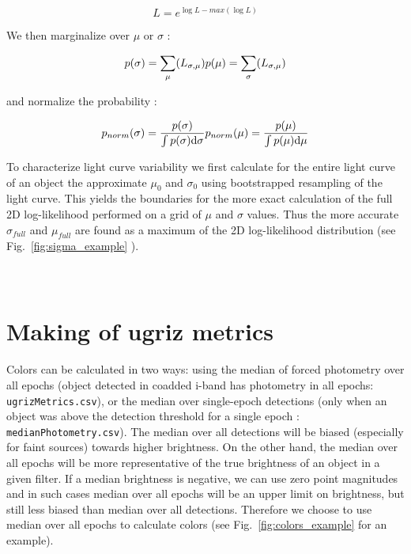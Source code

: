 \documentclass[fleqn,usenatbib]{mnras}  %
\begin{document}
\begin{equation}
L = e^{\log{L} - max(\log{L})}
\end{equation}

We then marginalize over $\mu$ or $\sigma$ : 

\begin{equation}
p(\sigma) = \sum_{\mu}(L_{\sigma,\mu}) \\
p(\mu) = \sum_{\sigma}(L_{\sigma,\mu})
\end{equation}

and normalize the probability :

\begin{equation}
p_{norm}(\sigma) = \frac{p(\sigma)}{ \int {p(\sigma) \text{d}\sigma}} \\ 
p_{norm}(\mu) = \frac{p(\mu)} {\int {p(\mu) \text{d}\mu} }
\end{equation}


To characterize  light curve variability we first calculate for the entire light curve of an object  the approximate $\mu_{0}$ and $\sigma_{0}$ using bootstrapped resampling of the light curve.  This yields the boundaries for the more exact calculation of the full 2D log-likelihood performed on a grid of $\mu$ and $\sigma$ values. Thus the more accurate $\sigma_{full}$ and $\mu_{full}$ are found as a maximum of the 2D log-likelihood distribution (see Fig.~\ref{fig:sigma_example} ).



\section{\\ Making of ugriz metrics }
\label{esc:ugriz_metrics}

Colors can be calculated in two ways: using the median of forced photometry over all epochs (object detected in coadded i-band has photometry in all epochs:  \verb|ugrizMetrics.csv|), or the median over single-epoch detections (only when an object was above the detection threshold for a single epoch : \verb|medianPhotometry.csv|).  
The median over all detections will be biased (especially for faint sources) towards higher brightness.  On the other hand, the median over all epochs will be more representative of the true brightness of an object in a given filter.  If a median brightness is negative, we can use zero point magnitudes and in such cases median over all epochs will be an upper limit on brightness, but still less biased than median over all detections. Therefore  we choose to use median over all epochs to calculate colors (see Fig.~\ref{fig:colors_example} for an example).  
\end{document}
